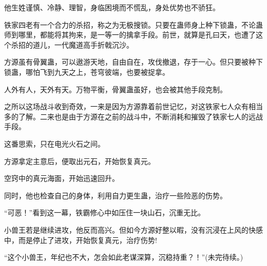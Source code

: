 \begin{this_body}
他生姓谨慎、冷静、理智，身临困境而不慌乱，身处优势也不骄狂。

铁家四老有一个合力的杀招，称之为无极搜锁。只要在蛊师身上种下锁蛊，不论蛊师到哪里，都能将其拘来，是一等一的擒拿手段。前世，就算是孔曰天，也遭了这个杀招的道儿，一代魔道高手折戟沉沙。

方源虽有骨翼蛊，可以遨游天地，自由自在，攻伐撤退，存于一心。但只要被种下锁蛊，哪怕飞到九天之上，苍穹彼端，也要被捉拿。

人外有人，天外有天。万物平衡，骨翼蛊虽好，也会被其他手段克制。

之所以这场战斗收到奇效，一来是因为方源靠着前世记忆，对这铁家七人众有相当多的了解。二来也是由于方源在之前的战斗中，不断消耗和摧毁了铁家七人的远战手段。

这番思索，只在电光火石之间。

方源拿定主意后，便取出元石，开始恢复真元。

空窍中的真元海面，开始迅速回升。

同时，他也检查自己的身体，利用自力更生蛊，治疗一些险恶的伤势。

“可恶！”看到这一幕，铁霸修心中如压住一块山石，沉重无比。

小兽王若是继续进攻，他反而高兴。但如今方源好整以暇，没有沉浸在上风的快感中，而是停止了进攻，开始恢复真元，治疗伤势!

“这个小兽王，年纪也不大，怎会如此老谋深算，沉稳持重？！”(未完待续。)

\end{this_body}


